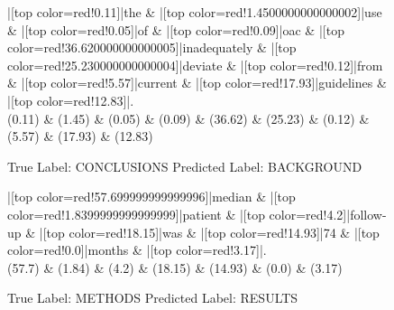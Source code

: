 \documentclass[a4paper, landscape]{article}
\begin{document}
\clearpage
\begin{figure}
\begin{center}
\begin{dependency}
\begin{deptext}
|[top color=red!0.11]|the \& |[top color=red!1.4500000000000002]|use \& |[top color=red!0.05]|of \& |[top color=red!0.09]|oac \& |[top color=red!36.620000000000005]|inadequately \& |[top color=red!25.230000000000004]|deviate \& |[top color=red!0.12]|from \& |[top color=red!5.57]|current \& |[top color=red!17.93]|guidelines \& |[top color=red!12.83]|.\\
(0.11) \& (1.45) \& (0.05) \& (0.09) \& (36.62) \& (25.23) \& (0.12) \& (5.57) \& (17.93) \& (12.83)\\
\end{deptext}
\end{dependency}
\end{center}
\caption{True Label: CONCLUSIONS Predicted Label: BACKGROUND}
\end{figure}
\clearpage
\begin{figure}
\begin{center}
\begin{dependency}
\begin{deptext}
|[top color=red!57.699999999999996]|median \& |[top color=red!1.8399999999999999]|patient \& |[top color=red!4.2]|follow-up \& |[top color=red!18.15]|was \& |[top color=red!14.93]|74 \& |[top color=red!0.0]|months \& |[top color=red!3.17]|.\\
(57.7) \& (1.84) \& (4.2) \& (18.15) \& (14.93) \& (0.0) \& (3.17)\\
\end{deptext}
\end{dependency}
\end{center}
\caption{True Label: METHODS Predicted Label: RESULTS}
\end{figure}
\clearpage
\end{document}
